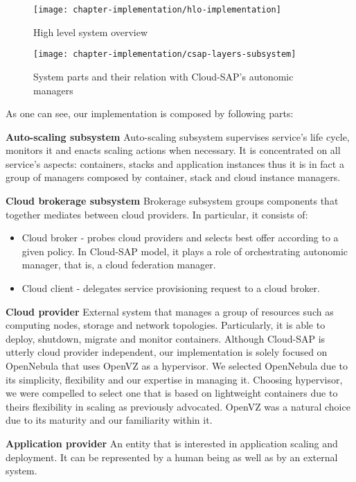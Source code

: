 \begin{figure}[!ht]
  \begin{center}
    \texttt{[image: chapter-implementation/hlo-implementation]}
  \end{center}
  \caption{High level system overview}
  \label{fig:hlo-implementation}
\end{figure}

\begin{figure}[!ht]
  \begin{center}
    \texttt{[image: chapter-implementation/csap-layers-subsystem]}
  \end{center}
  \caption{System parts and their relation with Cloud-SAP's autonomic managers}
  \label{fig:csap-layers-subsystem}
\end{figure}

As one can see, our implementation is composed by following parts:
\begin{asparaenum}
 \item[\textbf{Auto-scaling subsystem}] Auto-scaling subsystem supervises service's life cycle, monitors it and enacts scaling actions when necessary. It is concentrated on all service's aspects: containers, stacks and application instances thus it is in fact a group of managers composed by container, stack and cloud instance managers.

 \item[\textbf{Cloud brokerage subsystem}] Brokerage subsystem groups components that together mediates between cloud providers. In particular, it consists of:
  \begin{itemize}
   \item Cloud broker - probes cloud providers and selects best offer according to a given policy. In Cloud-SAP model, it plays a role of orchestrating autonomic manager, that is, a cloud federation manager.
   \item Cloud client - delegates service provisioning request to a cloud broker.
  \end{itemize}
 
 \item[\textbf{Cloud provider}] External system that manages a group of resources such as computing nodes, storage and network topologies. Particularly, it is able to deploy, shutdown, migrate and monitor containers. Although Cloud-SAP is utterly cloud provider independent, our implementation is solely focused on OpenNebula that uses OpenVZ as a hypervisor. We selected OpenNebula due to its simplicity, flexibility and our expertise in managing it. Choosing hypervisor, we were compelled to select one that is based on lightweight containers due to theirs flexibility in scaling as previously advocated. OpenVZ was a natural choice due to its maturity and our familiarity within it.
 
 \item[\textbf{Application provider}] An entity that is interested in application scaling and deployment. It can be represented by a human being as well as by an external system.
\end{asparaenum}

